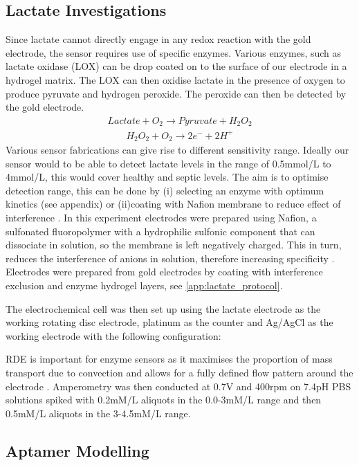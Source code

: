 \subsection{Lactate Investigations}
Since lactate cannot directly engage in any redox reaction with the gold electrode, the sensor requires use of specific enzymes. Various enzymes, such as lactate oxidase (LOX) can be drop coated on to the surface of our electrode in a hydrogel matrix. The LOX can then oxidise lactate in the presence of oxygen to produce pyruvate and hydrogen peroxide. The peroxide can then be detected by the gold electrode.
\begin{align}
    Lactate + O_{2}  \xrightarrow{} Pyruvate + H_{2}O_{2}
\end{align}
\begin{align}
    H_{2}O_{2} + O_{2}  \xrightarrow{} 2e^{-}+2H^{+}
\end{align}
Various sensor fabrications can give rise to different sensitivity range. Ideally our sensor would to be able to detect lactate levels in the range of 0.5mmol/L to 4mmol/L, this would cover healthy and septic levels. The aim is to optimise detection range, this can be done by (i) selecting an enzyme with optimum kinetics (see appendix) or (ii)coating with Nafion membrane to reduce effect of interference \cite{rathee2016biosensors}. In this experiment electrodes were prepared using Nafion, a sulfonated fluoropolymer with a hydrophilic sulfonic component that can dissociate in solution, so the membrane is left negatively charged. This in turn, reduces the interference of anions in solution, therefore increasing specificity \cite{romero2010amperometric}. Electrodes were prepared from gold electrodes by coating with interference exclusion and enzyme hydrogel layers, see \autoref{app:lactate_protocol}.

The electrochemical cell was then set up using the lactate electrode as the working rotating disc electrode, platinum as the counter and Ag/AgCl as the working electrode with the following configuration: 

RDE is important for enzyme sensors as it maximises the proportion of mass transport due to convection and allows for a fully defined flow pattern around the electrode \cite{nikolic2000theoretical}. Amperometry was then conducted at 0.7V and 400rpm on 7.4pH PBS solutions spiked with 0.2mM/L aliquots in the 0.0-3mM/L range and then 0.5mM/L aliquots in the 3-4.5mM/L range. \subsection{Aptamer Modelling}

